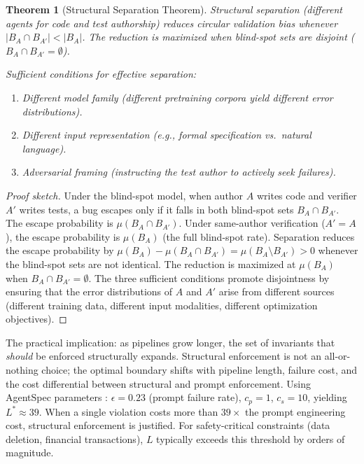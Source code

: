 \documentclass[11pt, a4paper]{googledeepmind}
\newtheorem{theorem}{Theorem}[section]
\begin{document}
\begin{theorem}[Structural Separation Theorem]
\label{thm:structural-separation}
Structural separation (different agents for code and test authorship) reduces circular validation bias whenever $|B_A \cap B_{A'}| < |B_A|$. The reduction is maximized when blind-spot sets are disjoint ($B_A \cap B_{A'} = \emptyset$).

Sufficient conditions for effective separation:
\begin{enumerate}[nosep]
    \item Different model family (different pretraining corpora yield different error distributions).
    \item Different input representation (e.g., formal specification vs.\ natural language).
    \item Adversarial framing (instructing the test author to actively seek failures).
\end{enumerate}
\end{theorem}

\begin{proof}[Proof sketch]
Under the blind-spot model, when author $A$ writes code and verifier $A'$ writes tests, a bug escapes only if it falls in both blind-spot sets $B_A \cap B_{A'}$. The escape probability is $\mu(B_A \cap B_{A'})$. Under same-author verification ($A' = A$), the escape probability is $\mu(B_A)$ (the full blind-spot rate). Separation reduces the escape probability by $\mu(B_A) - \mu(B_A \cap B_{A'}) = \mu(B_A \setminus B_{A'}) > 0$ whenever the blind-spot sets are not identical. The reduction is maximized at $\mu(B_A)$ when $B_A \cap B_{A'} = \emptyset$. The three sufficient conditions promote disjointness by ensuring that the error distributions of $A$ and $A'$ arise from different sources (different training data, different input modalities, different optimization objectives).
\end{proof}

The practical implication: as pipelines grow longer, the set of invariants that \emph{should} be enforced structurally expands. Structural enforcement is not an all-or-nothing choice; the optimal boundary shifts with pipeline length, failure cost, and the cost differential between structural and prompt enforcement. Using AgentSpec parameters \citep{wang2026agentspec}: $\epsilon = 0.23$ (prompt failure rate), $c_p = 1$, $c_s = 10$, yielding $L^* \approx 39$. When a single violation costs more than $39\times$ the prompt engineering cost, structural enforcement is justified. For safety-critical constraints (data deletion, financial transactions), $L$ typically exceeds this threshold by orders of magnitude.
\end{document}
